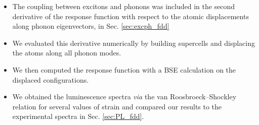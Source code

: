 \vspace{1cm}
\begin{tcolorbox}[enhanced jigsaw,breakable,pad at break*=1mm,
	colback=cyanamu!5!white,colframe=blueamu!90!white,title=Summary of Chapter {\hypersetup{linkcolor=.}\ref{chap:strain}}]
	\begin{itemize}
		\item The coupling between excitons and phonons was included in the second derivative of the response function with respect to the atomic displacements along phonon eigenvectors, in Sec. \ref{sec:excph_fdd}
		\item We evaluated this derivative numerically by building supercells and displacing the atoms along all phonon modes. 
		\item We then computed the response function with a \acrshort{BSE} calculation on the displaced configurations.
		\item We obtained the luminescence spectra \textit{via} the van Roosbroeck--Shockley relation for several values of strain and compared our results to the experimental spectra in Sec. \ref{sec:PL_fdd}.
	\end{itemize}  
\end{tcolorbox}

\newpage